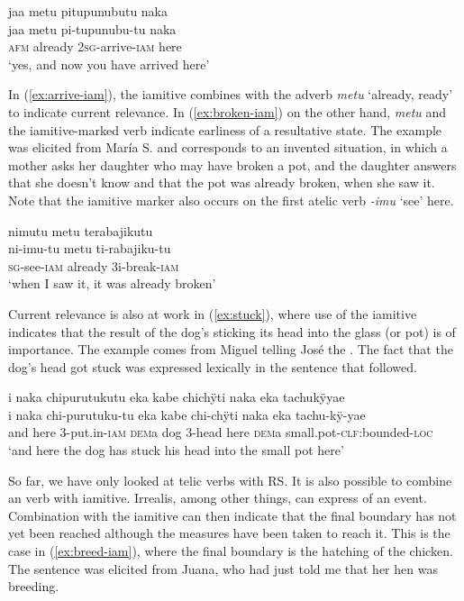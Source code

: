 \ea\label{ex:arrive-iam}
\begingl
\glpreamble jaa metu pitupunubutu naka\\
\gla jaa metu pi-tupunubu-tu naka\\
\glb \textsc{afm} already 2\textsc{sg}-arrive-\textsc{iam} here\\
\glft ‘yes, and now you have arrived here’
\endgl
\trailingcitation{[rxx-e181017l.005]}
\xe

In (\ref{ex:arrive-iam}), the iamitive combines with the adverb \textit{metu} ‘already, ready’ to indicate current relevance. In (\ref{ex:broken-iam}) on the other hand, \textit{metu} and the iamitive-marked verb indicate earliness of a resultative state. The example was elicited from María S. and corresponds to an invented situation, in which a mother asks her daughter who may have broken a pot, and the daughter answers that she doesn’t know and that the pot was already broken, when she saw it. Note that the iamitive marker also occurs on the first atelic verb \textit{-imu} ‘see’ here.

\ea\label{ex:broken-iam}
\begingl
\glpreamble nimutu metu terabajikutu\\
\gla ni-imu-tu metu ti-rabajiku-tu\\
\textsc{sg}-see-\textsc{iam} already 3i-break-\textsc{iam}\\
\glft ‘when I saw it, it was already broken’
\endgl
{}
\xe

Current relevance is also at work in (\ref{ex:stuck}), where use of the iamitive indicates that the result of the dog’s sticking its head into the glass (or pot) is of importance. The example comes from Miguel telling José the . The fact that the dog’s head got stuck was expressed lexically in the sentence that followed. 

\ea\label{ex:stuck}
\begingl
\glpreamble i naka chipurutukutu eka kabe chichÿti naka eka tachukÿyae\\
\gla i naka chi-purutuku-tu eka kabe chi-chÿti naka eka tachu-kÿ-yae\\
\glb and here 3-put.in-\textsc{iam} \textsc{dem}a dog 3-head here \textsc{dem}a small.pot-\textsc{clf}:bounded-\textsc{loc}\\
\glft ‘and here the dog has stuck his head into the small pot here’
\endgl
\trailingcitation{[mox-a110920l-2.052]}
\xe

So far, we have only looked at telic verbs with  RS. It is also possible to combine an  verb with iamitive. Irrealis, among other things, can express  of an event. Combination with the iamitive can then indicate that the final boundary has not yet been reached although the measures have been taken to reach it. This is the case in (\ref{ex:breed-iam}), where the final boundary is the hatching of the chicken. The sentence was elicited from Juana, who had just told me that her hen was breeding.

